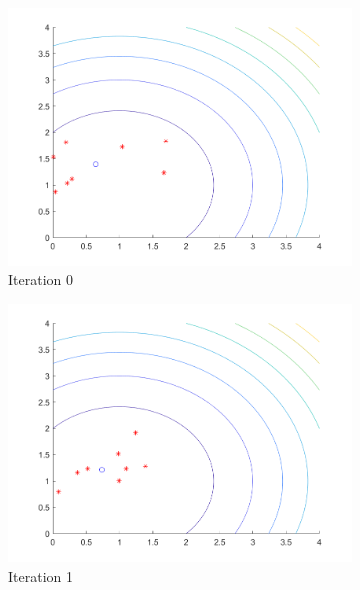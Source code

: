 \begin{figure}
  \begin{subfigure}[b]{0.4\textwidth}
    \includegraphics[width=\textwidth]{img/pa/hunting_ex/hunt-init}
    \caption{Iteration 0}
    \label{fig:hnt-iter-0}
  \end{subfigure}
  \begin{subfigure}[b]{0.4\textwidth}
    \includegraphics[width=\textwidth]{img/pa/hunting_ex/hunt-iter-1}
    \caption{Iteration 1}
    \label{fig:hnt-iter-1}
  \end{subfigure}
  \begin{subfigure}[b]{0.4\textwidth}

\end{subfigure}
\end{figure}
